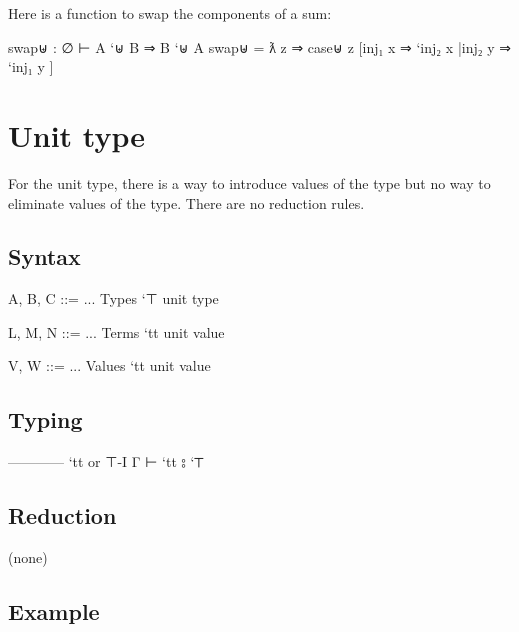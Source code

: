 Here is a function to swap the components of a sum:

\begin{myDisplay}
swap⊎ : ∅ ⊢ A `⊎ B ⇒ B `⊎ A
swap⊎ = ƛ z ⇒ case⊎ z
                [inj₁ x ⇒ `inj₂ x
                |inj₂ y ⇒ `inj₁ y ]
\end{myDisplay}

\hypertarget{unit-type}{%
\section{Unit type}\label{unit-type}}

For the unit type, there is a way to introduce values of the type but no
way to eliminate values of the type. There are no reduction rules.

\hypertarget{syntax-5}{%
\subsection{Syntax}\label{syntax-5}}

\begin{myDisplay}
A, B, C ::= ...                     Types
  `⊤                                  unit type

L, M, N ::= ...                     Terms
  `tt                                 unit value

V, W ::= ...                        Values
  `tt                                 unit value
\end{myDisplay}

\hypertarget{typing-5}{%
\subsection{Typing}\label{typing-5}}

\begin{myDisplay}
------------ `tt or ⊤-I
Γ ⊢ `tt ⦂ `⊤
\end{myDisplay}

\hypertarget{reduction-5}{%
\subsection{Reduction}\label{reduction-5}}

(none)

\hypertarget{example-5}{%
\subsection{Example}\label{example-5}}

